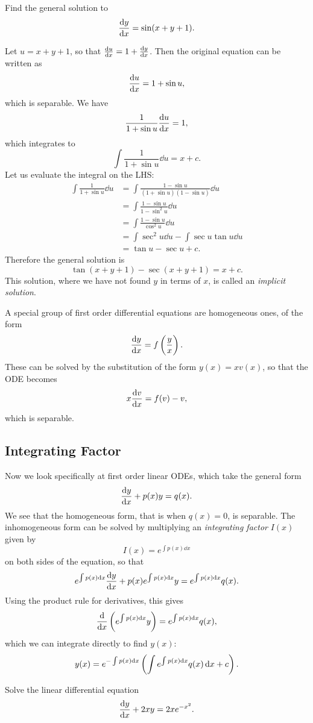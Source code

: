 \begin{exercise}
Find the general solution to
\[\dv{y}{x}=\sin(x+y+1).\]
\end{exercise}

\begin{solution}
Let $u=x+y+1$, so that $\dv{u}{x}=1+\dv{y}{x}$. Then the original equation can be written as
\[\dv{u}{x}=1+\sin u,\]
which is separable. We have 
\[\frac{1}{1+\sin u}\dv{u}{x}=1,\]
which integrates to
\[\int\frac{1}{1+\sin u}\dd{u}=x+c.\]
Let us evaluate the integral on the LHS:
\begin{align*}
\int\frac{1}{1+\sin u}\dd{u}&=\int\frac{1-\sin u}{(1+\sin u)(1-\sin u)}\dd{u}\\
&=\int\frac{1-\sin u}{1-\sin^2 u}\dd{u}\\
&=\int\frac{1-\sin u}{\cos^2 u}\dd{u}\\
&=\int\sec^2 u\dd{u}-\int\sec u\tan u\dd{u}\\
&=\tan u-\sec u+c.
\end{align*}
Therefore the general solution is
\[\tan(x+y+1)-\sec(x+y+1)=x+c.\]
This solution, where we have not found $y$ in terms of $x$, is called an \emph{implicit solution}.
\end{solution}

A special group of first order differential equations are homogeneous ones, of the form
\[\dv{y}{x}=f\left(\frac{y}{x}\right).\]
These can be solved by the substitution of the form $y(x)=xv(x)$, so that the ODE becomes
\[x\dv{v}{x}=f(v)-v,\]
which is separable.

\subsection{Integrating Factor}
Now we look specifically at first order linear ODEs, which take the general form
\[\dv{y}{x}+p(x)y=q(x).\]
We see that the homogeneous form, that is when $q(x)=0$, is separable. The inhomogeneous form can be solved by multiplying an \emph{integrating factor} $I(x)$ given by
\[I(x)=e^{\int p(x)\dd{x}}\]
on both sides of the equation, so that
\[e^{\int p(x)\dd{x}}\dv{y}{x}+p(x)e^{\int p(x)\dd{x}}y=e^{\int p(x)\dd{x}}q(x).\]
Using the product rule for derivatives, this gives
\[\dv{}{x}\left(e^{\int p(x)\dd{x}}y\right)=e^{\int p(x)\dd{x}}q(x),\]
which we can integrate directly to find $y(x)$:
\[y(x)=e^{-\int p(x)\dd{x}}\left(\int e^{\int p(x)\dd{x}}q(x)\dd{x}+c\right).\]

\begin{exercise}
Solve the linear differential equation
\[\dv{y}{x}+2xy=2xe^{-x^2}.\]
\end{exercise}

